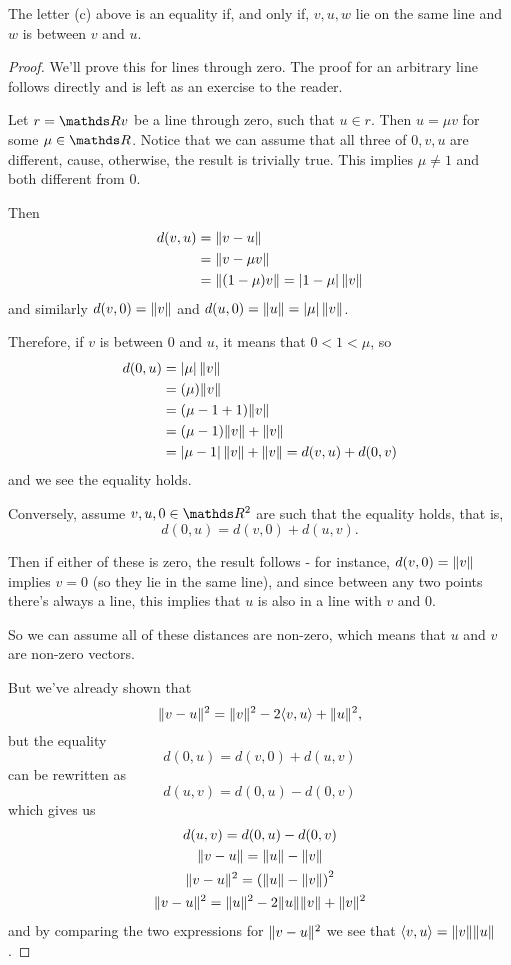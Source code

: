 \begin{cor}
	The letter (c) above is an equality if, and only if, $v,u,w$ lie on the same line and $w$ is between $v$ and $u$.
\end{cor}
\begin{proof}
	We'll prove this for lines through zero. The proof for an arbitrary line follows directly and is left as an exercise to the reader.
	
	Let $r=\R v$ be a line through zero, such that $u\in r$. Then $u=\mu v$ for some $\mu\in \R$. Notice that we can assume that all three of $0,v,u$ are different, cause, otherwise, the result is trivially true. This implies $\mu\neq 1$ and both different from $0$.
	
	Then
	\begin{align*}
		d(v,u)&=\lVert v-u\rVert\\
		&=\lVert v-\mu v\rVert\\
		&=\lVert(1-\mu)v\rVert=\left\vert1-\mu\right\vert\lVert v\rVert
	\end{align*}and similarly $d(v,0)=\lVert v\rVert$ and $d(u,0)=\lVert u\rVert=\left\vert\mu\right\vert\lVert v\rVert$.
	
	Therefore, if $v$ is between $0$ and $u$, it means that $0<1<\mu$, so
	\begin{align*}
		d(0,u)&=\left\vert\mu\right\vert\lVert v\rVert\\
		&=(\mu)\lVert v\rVert\\
		&=(\mu-1+1)\lVert v\rVert\\
		&=(\mu-1)\lVert v\rVert+\lVert v\rVert\\
		&=\left\vert\mu-1\right\vert\lVert v\rVert+\lVert v\rVert=d(v,u)+d(0,v)
	\end{align*}and we see the equality holds.
	
	\bigskip
	Conversely, assume $v,u,0\in \R^2$ are such that the equality holds, that is, 
	\[d(0,u)=d(v,0)+d(u,v).\]
	
	Then if either of these is zero, the result follows - for instance, $d(v,0)=\lVert v\rVert$ implies $v=0$ (so they lie in the same line), and since between any two points there's always a line, this implies that $u$ is also in a line with $v$ and $0$.
	
	So we can assume all of these distances are non-zero, which means that $u$ and $v$ are non-zero vectors. 
	
	But we've already shown that
	\[\lVert v-u\rVert^2=\lVert v\rVert^2-2\langle v,u\rangle+\lVert u\rVert^2,\]but the equality\[d(0,u)=d(v,0)+d(u,v)\]can be rewritten as
	\[d(u,v)=d(0,u)-d(0,v)\]which gives us
	\begin{gather*}
		d(u,v)=d(0,u)-d(0,v)\\
		\lVert v-u\rVert=\lVert u\rVert-\lVert v\rVert\\
		\lVert v-u\rVert^2=\left(\lVert u\rVert-\lVert v\rVert\right)^2\\
		\lVert v-u\rVert^2=\lVert u\rVert^2-2\lVert u\rVert\lVert v\rVert+\lVert v\rVert^2
	\end{gather*}and by comparing the two expressions for $\lVert v-u\rVert^2$ we see that $\langle v,u\rangle=\lVert v\rVert\lVert u\rVert$.
	

\end{proof}
